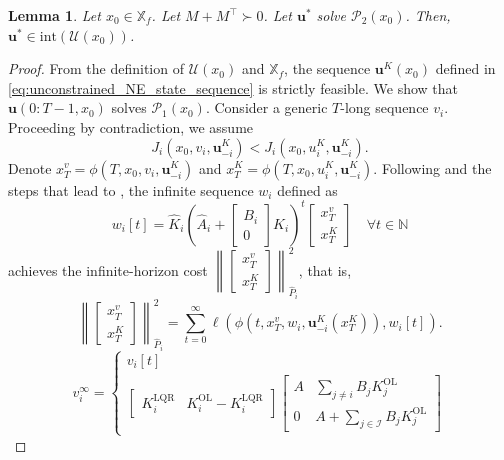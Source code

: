 \documentclass[letterpaper, 10 pt, conference]{ieeeconf}  %
\newcommand{\N}{\mathbb{N}}
\newcommand{\mc}{\mathcal}
\newcommand{\Kol}{K^{\mathrm{OL}}}
\newcommand{\Klqr}{K^{\mathrm{LQR}}}
\newcommand{\bu}{\boldsymbol{u}}
\newcommand{\tsum}{\textstyle\sum}
\newtheorem{lemma}[theorem]{Lemma}
\begin{document}
\begin{lemma}
    Let $x_0\in \mathbb{X}_f$. Let $M+M^{\top}\succ 0$. Let $\bu^*$ solve $\mc P_2(x_0)$. Then, $\bu^*\in\mathrm{int}(\mc U(x_0))$. 
\end{lemma}
\begin{proof}
    From the definition of $\mc U(x_0)$ and $\mathbb{X}_f$, the sequence $\bu^K(x_0)$ defined in \eqref{eq:unconstrained_NE_state_sequence}
    is strictly feasible. We show that $\bu(0:T-1, x_0)$ solves $\mc P_1(x_0)$. Consider a generic $T$-long sequence $v_i$. Proceeding by contradiction, we assume  
    \begin{equation}
        J_i(x_0, v_i, \bu^K_{-i}) < J_i(x_0,u_i^K,\bu_{-i}^K).
    \end{equation}
    Denote $x^v_T = \phi(T, x_0, v_i, \bu_{-i}^K)$ and $x^K_T = \phi(T, x_0, u_i^K, \bu_{-i}^K)$. 
    Following \cite[Lemma 1]{benenati2024linear} and the steps that lead to \cite[Eq. 21]{benenati2024linear}, the infinite sequence $w_i$ defined as
    \begin{equation}
        w_i[t]  = \hat{K}_i \left(\hat{A}_i + \begin{bmatrix}
            B_i \\0
        \end{bmatrix} \hat{K}_i\right)^t \begin{bmatrix}
            x_T^v \\ x_T^K
        \end{bmatrix} \quad \forall t\in\N
    \end{equation}
    achieves the infinite-horizon cost $\left\|\begin{bmatrix}
            x_T^v \\ x_T^K
        \end{bmatrix} \right\|^2_{\hat{P}_i}$, that is,
    \begin{equation}
        \left\|\begin{bmatrix}
            x_T^v \\ x_T^K
        \end{bmatrix} \right\|^2_{\hat{P}_i} = \sum_{t=0}^\infty \ell(\phi(t, x_T^v, w_i, \bu^K_{-i}(x_T^K)) , w_i[t] ).
    \end{equation}
    \begin{equation}
        v_i^\infty = \begin{cases}
            v_i[t] \\ 
            \begin{bmatrix}
                \Klqr_i & \Kol_i - \Klqr_i
            \end{bmatrix} \begin{bmatrix}
                A & \tsum_{j\neq i} B_j \Kol_j \\
                0 & A + \tsum_{j\in\mc I} B_j \Kol_j
            \end{bmatrix}
        \end{cases}
    \end{equation}
    

\end{proof}
\end{document}
